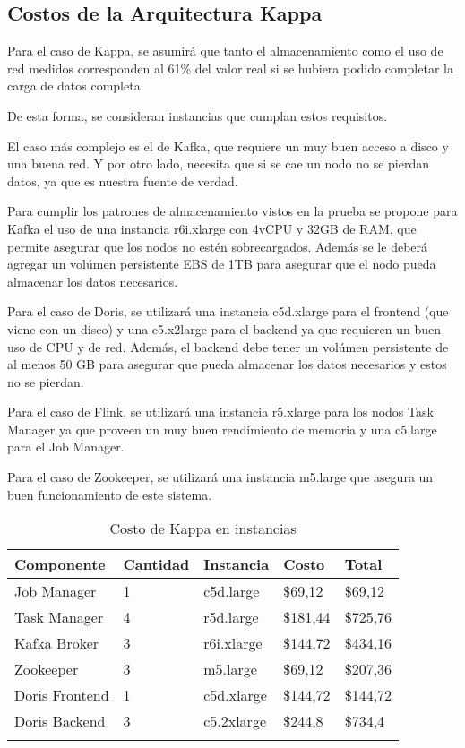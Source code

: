 \newpage
\subsection{Costos de la Arquitectura Kappa}

Para el caso de Kappa, se asumirá que tanto el almacenamiento como el uso de red medidos corresponden al 61\% del valor real si se hubiera podido completar la carga de datos completa.\newline

De esta forma, se consideran instancias que cumplan estos requisitos. 

El caso más complejo es el de Kafka, que requiere un muy buen acceso a disco y una buena red. Y por otro lado, necesita que si se cae un nodo no se pierdan datos, ya que es nuestra fuente de verdad. \newline

Para cumplir los patrones de almacenamiento vistos en la prueba se propone para Kafka el uso de una instancia r6i.xlarge con 4vCPU y 32GB de RAM,
 que permite asegurar que los nodos no estén sobrecargados. Además se le deberá agregar un volúmen persistente EBS de 1TB para asegurar que el nodo pueda almacenar los datos necesarios.\newline

Para el caso de Doris, se utilizará una instancia c5d.xlarge para el frontend (que viene con un disco) y una c5.x2large para el backend ya que requieren un buen uso de CPU y de red. 
Además, el backend debe tener un volúmen persistente de al menos 50 GB para asegurar que pueda almacenar los datos necesarios y estos no se pierdan. \newline

Para el caso de Flink, se utilizará una instancia r5.xlarge para los nodos Task Manager  ya que proveen un muy buen rendimiento de memoria y una c5.large para el Job Manager. \newline

Para el caso de Zookeeper, se utilizará una instancia m5.large que asegura un buen funcionamiento de este sistema.  

\newpage

\begin{longtable}{|p{3cm}|p{2cm}|p{2cm}|p{2cm}|p{3cm}|}
    \hline
    \textbf{Componente} & \textbf{Cantidad} & \textbf{Instancia} & \textbf{Costo} & \textbf{Total} \\
    \hline
    Job Manager & 1 & c5d.large & \$69,12 & \$69,12 \\
    \hline
    Task Manager & 4 & r5d.large & \$181,44 & \$725,76 \\
    \hline
    Kafka Broker & 3 & r6i.xlarge & \$144,72 & \$434,16 \\
    \hline
    Zookeeper & 3 & m5.large & \$69,12 & \$207,36 \\
    \hline
    Doris Frontend & 1 & c5d.xlarge & \$144,72 & \$144,72 \\
    \hline
    Doris Backend & 3 & c5.2xlarge & \$244,8 & \$734,4 \\
    \hline
    \caption{Costo de Kappa en instancias} \\
\end{longtable}

